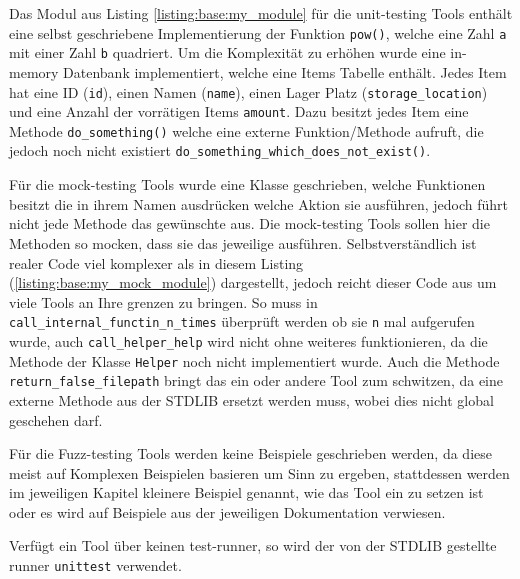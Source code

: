 Das Modul aus Listing \ref{listing:base:my_module} für die unit-testing Tools
enthält eine selbst geschriebene Implementierung der Funktion \lstinline|pow()|,
welche eine Zahl \lstinline|a| mit einer Zahl \lstinline|b| quadriert. Um die
Komplexität zu erhöhen wurde eine in-memory Datenbank implementiert, welche
eine Items Tabelle enthält. Jedes Item hat eine ID (\lstinline|id|), einen Namen
(\lstinline|name|), einen Lager Platz (\lstinline|storage_location|) und eine
Anzahl der vorrätigen Items \lstinline|amount|. Dazu besitzt jedes Item eine
Methode \lstinline|do_something()| welche eine externe Funktion/Methode aufruft,
die jedoch noch nicht existiert \lstinline|do_something_which_does_not_exist()|.

Für die \gls{mock}-testing Tools wurde eine Klasse geschrieben, welche Funktionen besitzt
die in ihrem Namen ausdrücken welche Aktion sie ausführen, jedoch führt nicht jede Methode
das gewünschte aus. Die \gls{mock}-testing Tools sollen hier die Methoden so \gls{mock}en, dass
sie das jeweilige ausführen. Selbstverständlich ist realer Code viel komplexer als in diesem
Listing (\ref{listing:base:my_mock_module}) dargestellt, jedoch reicht dieser Code aus um viele
Tools an Ihre grenzen zu bringen. So muss in \lstinline{call_internal_functin_n_times} überprüft
werden ob sie \lstinline{n} mal aufgerufen wurde, auch \lstinline{call_helper_help} wird nicht
ohne weiteres funktionieren, da die Methode der Klasse \lstinline{Helper} noch nicht implementiert wurde. Auch die Methode \lstinline{return_false_filepath}
bringt das ein oder andere Tool zum schwitzen, da eine externe Methode aus der STDLIB ersetzt
werden muss, wobei dies nicht global geschehen darf.

Für die Fuzz-testing Tools werden keine Beispiele geschrieben werden, da diese meist auf Komplexen
Beispielen basieren um Sinn zu ergeben, stattdessen werden im jeweiligen Kapitel kleinere Beispiel
genannt, wie das Tool ein zu setzen ist oder es wird auf Beispiele aus der jeweiligen Dokumentation
verwiesen.

Verfügt ein Tool über keinen test-runner, so wird der von der STDLIB gestellte runner
\lstinline{unittest} verwendet.







